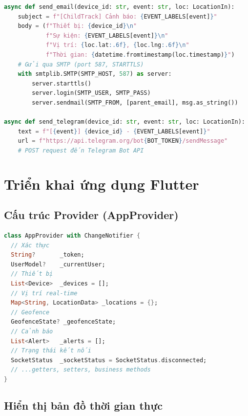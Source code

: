 \begin{lstlisting}[language=python, caption=Gửi cảnh báo qua Email và Telegram]
async def send_email(device_id: str, event: str, loc: LocationIn):
    subject = f"[ChildTrack] Cảnh báo: {EVENT_LABELS[event]}"
    body = (f"Thiết bị: {device_id}\n"
            f"Sự kiện: {EVENT_LABELS[event]}\n"
            f"Vị trí: {loc.lat:.6f}, {loc.lng:.6f}\n"
            f"Thời gian: {datetime.fromtimestamp(loc.timestamp)}")
    # Gửi qua SMTP (port 587, STARTTLS)
    with smtplib.SMTP(SMTP_HOST, 587) as server:
        server.starttls()
        server.login(SMTP_USER, SMTP_PASS)
        server.sendmail(SMTP_FROM, [parent_email], msg.as_string())

async def send_telegram(device_id: str, event: str, loc: LocationIn):
    text = f"[{event}] {device_id} - {EVENT_LABELS[event]}"
    url = f"https://api.telegram.org/bot{BOT_TOKEN}/sendMessage"
    # POST request đến Telegram Bot API
\end{lstlisting}

\section{Triển khai ứng dụng Flutter}

\subsection{Cấu trúc Provider (AppProvider)}

\begin{lstlisting}[language=dart, caption=Các trường trạng thái trong AppProvider]
class AppProvider with ChangeNotifier {
  // Xác thực
  String?       _token;
  UserModel?    _currentUser;
  // Thiết bị
  List<Device>  _devices = [];
  // Vị trí real-time
  Map<String, LocationData> _locations = {};
  // Geofence
  GeofenceState? _geofenceState;
  // Cảnh báo
  List<Alert>   _alerts = [];
  // Trạng thái kết nối
  SocketStatus  _socketStatus = SocketStatus.disconnected;
  // ...getters, setters, business methods
}
\end{lstlisting}

\subsection{Hiển thị bản đồ thời gian thực}

